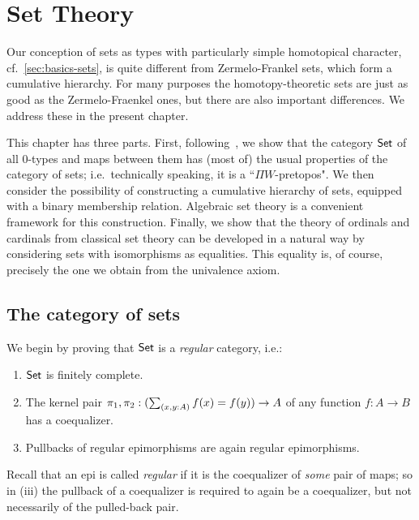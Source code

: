 \newcommand{\vset}{\mathsf{set}}  %

\chapter{Set Theory}
\label{cha:set-math}

Our conception of sets as types with particularly simple homotopical character, cf.\
\autoref{sec:basics-sets}, is quite different from Zermelo-Frankel sets, which form a
cumulative hierarchy. For many purposes the homotopy-theoretic sets are just as good as
the Zermelo-Fraenkel ones, but there are also important differences. We address these in
the present chapter. 

This chapter has three parts. First, following~\cite{RijkeSpitters}, we show that the category $\mathsf{Set}$ of all $0$-types and maps between them has (most of) the usual properties of the category of sets; i.e.\ technically speaking, it is a ``$\Pi W$-pretopos".  We then  consider the possibility of constructing a cumulative hierarchy of sets, equipped with a binary membership relation. Algebraic set theory is a convenient framework for this construction. Finally, we show that the theory of ordinals and cardinals from classical set theory can be developed in a natural way by considering sets with isomorphisms as equalities. This equality is, of course, precisely the one we obtain from the univalence axiom.

\section{The category of sets}
\label{sec:piw-pretopos}

We begin by proving that $\mathsf{Set}$ is a \emph{regular} category, i.e.:
%
\begin{enumerate}
\item $\mathsf{Set}$ is finitely complete.
\item The kernel pair $\pi_1,\pi_2: (\sm{x,y:A} f(x)= f(y)) \to A$ of any
      function $f : A \to B$ has a coequalizer.
\item Pullbacks of regular epimorphisms are again regular epimorphisms.
\end{enumerate}
%
Recall that an epi is called \emph{regular} if it is the coequalizer of \emph{some} pair of maps; so in (iii) the pullback of a coequalizer is required to again be a coequalizer, but not necessarily of the pulled-back pair. 

